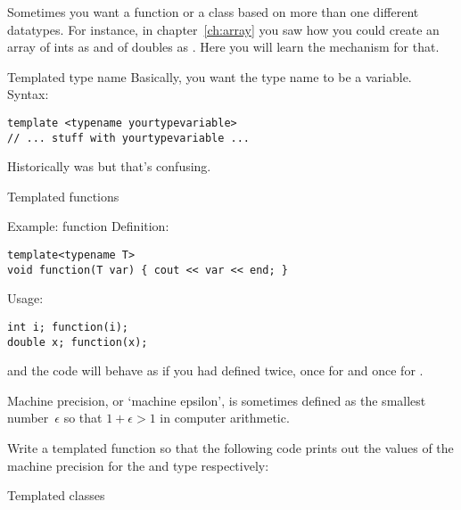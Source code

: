 
Sometimes you want a function or a class based on more than one
different datatypes. For instance, in chapter~\ref{ch:array} you saw
how you could create an array of ints as  and
of doubles as . Here you will learn the mechanism
for that.

\begin{block}{Templated type name}
  \label{sl:template-gen}
  Basically, you want the type name to be a variable. Syntax:
\begin{verbatim}
template <typename yourtypevariable>
// ... stuff with yourtypevariable ...
\end{verbatim}
\end{block}

Historically  was  but that's confusing.

 {Templated functions}

\begin{block}{Example: function}
  \label{sl:template-fun}
  Definition:
\begin{verbatim}
template<typename T>
void function(T var) { cout << var << end; }
\end{verbatim}
Usage:
\begin{verbatim}
int i; function(i);
double x; function(x);
\end{verbatim}
and the code will behave as if you had defined  twice,
once for  and once for .
\end{block}

\begin{exercise}
  \label{ex:eps-template}
  Machine precision, or `machine epsilon', is sometimes defined as the
  smallest number~$\epsilon$ so that $1+\epsilon>1$ in computer
  arithmetic.

  Write a templated function  so that the following code
  prints out the values of the machine precision for the  and
   type respectively:
%
\end{exercise}

 {Templated classes}


